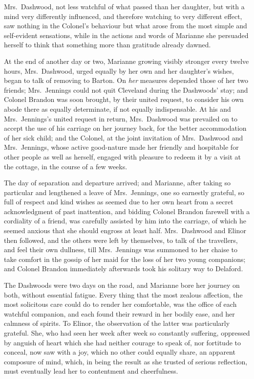 Mrs.\ Dashwood, not less watchful of what passed than
her daughter, but with a mind very differently influenced,
and therefore watching to very different effect,
saw nothing in the Colonel's behaviour but what arose
from the most simple and self-evident sensations, while in
the actions and words of Marianne she persuaded herself
to think that something more than gratitude already dawned.

At the end of another day or two, Marianne growing
visibly stronger every twelve hours, Mrs.\ Dashwood,
urged equally by her own and her daughter's wishes,
began to talk of removing to Barton.  On \emph{her} measures
depended those of her two friends; Mrs.\ Jennings could
not quit Cleveland during the Dashwoods' stay; and Colonel
Brandon was soon brought, by their united request,
to consider his own abode there as equally determinate,
if not equally indispensable.  At his and Mrs.\ Jennings's
united request in return, Mrs.\ Dashwood was prevailed
on to accept the use of his carriage on her journey back,
for the better accommodation of her sick child; and the Colonel,
at the joint invitation of Mrs.\ Dashwood and Mrs.\ Jennings,
whose active good-nature made her friendly and hospitable
for other people as well as herself, engaged with pleasure
to redeem it by a visit at the cottage, in the course
of a few weeks.

The day of separation and departure arrived;
and Marianne, after taking so particular and lengthened
a leave of Mrs.\ Jennings, one so earnestly grateful, so full
of respect and kind wishes as seemed due to her own heart
from a secret acknowledgment of past inattention, and bidding
Colonel Brandon farewell with a cordiality of a friend,
was carefully assisted by him into the carriage, of which he
seemed anxious that she should engross at least half.
Mrs.\ Dashwood and Elinor then followed, and the others
were left by themselves, to talk of the travellers,
and feel their own dullness, till Mrs.\ Jennings was summoned
to her chaise to take comfort in the gossip of her maid
for the loss of her two young companions; and Colonel Brandon
immediately afterwards took his solitary way to Delaford.

The Dashwoods were two days on the road, and Marianne
bore her journey on both, without essential fatigue.
Every thing that the most zealous affection, the most
solicitous care could do to render her comfortable,
was the office of each watchful companion, and each
found their reward in her bodily ease, and her calmness
of spirits.  To Elinor, the observation of the latter
was particularly grateful.  She, who had seen her week
after week so constantly suffering, oppressed by anguish
of heart which she had neither courage to speak of,
nor fortitude to conceal, now saw with a joy, which no other
could equally share, an apparent composure of mind, which,
in being the result as she trusted of serious reflection,
must eventually lead her to contentment and cheerfulness.

